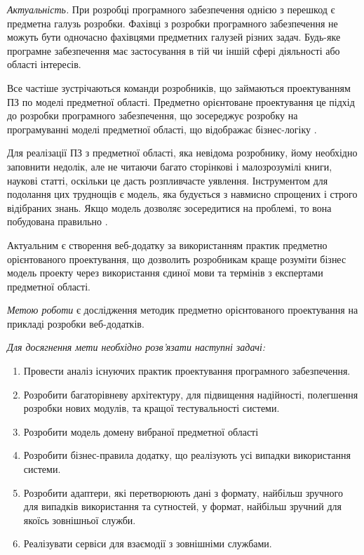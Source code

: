 
\emph{Актуальність.} При розробці програмного забезпечення однією з перешкод є предметна галузь розробки.
Фахівці з розробки програмного забезпечення не можуть бути одночасно фахівцями предметних галузей різних задач.
Будь-яке програмне забезпечення має застосування в тій чи іншій сфері діяльності або області
інтересів.

Все частіше зустрічаються команди розробників, що займаються проектуванням ПЗ по моделі
предметної області. Предметно орієнтоване проектування це підхід до розробки програмного
забезпечення, що зосереджує розробку на програмуванні моделі предметної області, що відображає
бізнес-логіку \cite{ddd-article}.

Для реалізації ПЗ з предметної області, яка невідома розробнику, йому необхідно заповнити
недолік, але не читаючи багато сторінкові і малозрозумілі книги, наукові статті, оскільки
це дасть розпливчасте уявлення. Інструментом для подолання цих труднощів є модель, яка
будується з навмисно спрощених і строго відібраних знань. Якщо модель дозволяє зосередитися
на проблемі, то вона побудована правильно \cite{ddd-evans}.

Актуальним є створення веб-додатку за використанням практик предметно орієнтованого
проектування, що дозволить розробникам краще розуміти бізнес модель проекту через
використання єдиної мови та термінів з експертами предметної області.

\emph{Метою роботи} є дослідження методик предметно орієнтованого проектування
на прикладі розробки веб-додатків.

\textit{Для досягнення мети необхідно розв'язати наступні задачі:}

\begin{enumerate}
  \item Провести аналіз існуючих практик проектування програмного забезпечення.
	\item Розробити багаторівневу архітектуру, для підвищення надійності,
		полегшення розробки нових модулів, та кращої тестувальності системи.
	\item Розробити модель домену вибраної предметної області
	\item Розробити бізнес-правила додатку, що реалізують усі випадки
		використання системи.
	\item Розробити адаптери, які перетворюють дані з формату,
		найбільш зручного для випадків використання та сутностей,
		у формат, найбільш зручний для якоїсь зовнішньої служби.
	\item Реалізувати сервіси для взаємодії з зовнішніми службами.
\end{enumerate}

